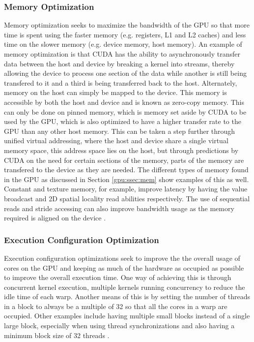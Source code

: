 \subsubsection{Memory Optimization}
Memory optimization seeks to maximize the bandwidth of the GPU so that more time is spent using the faster memory (e.g. registers, L1 and L2 caches) and less time on the slower memory (e.g. device memory, host memory). An example of memory optimization is that CUDA has the ability to asynchronously transfer data between the host and device by breaking a kernel into streams, thereby allowing the device to process one section of the data while another is still being transfered to it and a third is being transferred back to the host. Alternately, memory on the host can simply be mapped to the device. This memory is accessible by both the host and device and is known as zero-copy memory. This can only be done on pinned memory, which is memory set aside by CUDA to be used by the GPU, which is also optimized to have a higher transfer rate to the GPU than any other host memory. This can be taken a step further through unified virtual addressing, where the host and device share a single virtual memory space, this address space lies on the host, but through predictions by CUDA on the need for certain sections of the memory, parts of the memory are transfered to the device as they are needed. The different types of memory found in the GPU as discussed in Section \ref{gpu:ssec:mem} show examples of this as well. Constant and texture memory, for example, improve latency by having the value broadcast and 2D spatial locality read abilities respectively. The use of sequential reads and stride accessing can also improve bandwidth usage as the memory required is aligned on the device \citep{CUDA}.
%
\subsubsection{Execution Configuration Optimization}
Execution configuration optimizations seek to improve the the overall usage of cores on the GPU and keeping as much of the hardware as occupied as possible to improve the overall execution time. One way of achieving this is through concurrent kernel execution, multiple kernels running concurrency to reduce the idle time of each warp. Another means of this is by setting the number of threads in a block to always be a multiple of 32 so that all the cores in a warp are occupied. Other examples include having multiple small blocks instead of a single large block, especially when using thread synchronizations and also having a minimum block size of 32 threads \citep{CUDA}.
%
